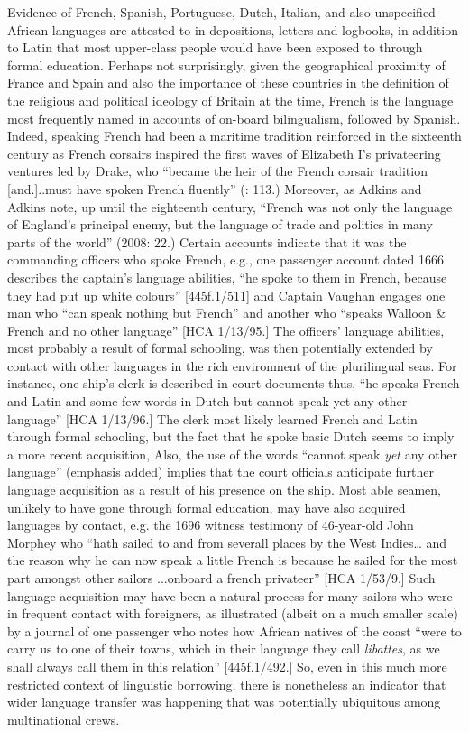 Evidence of French, Spanish, Portuguese, Dutch, Italian, and also unspecified African languages are attested to in depositions, letters and logbooks, in addition to Latin that most upper-class people would have been exposed to through formal education. Perhaps not surprisingly, given the geographical proximity of France and Spain and also the importance of these countries in the definition of the religious and political ideology of Britain at the time, French is the language most frequently named in accounts of on-board bilingualism, followed by Spanish. Indeed, speaking French had been a maritime tradition reinforced in the sixteenth century as French corsairs inspired the first waves of Elizabeth I’s privateering ventures led by Drake, who “became the heir of the French corsair tradition [and.]..must have spoken French fluently” (\citealt{Bicheno2012}: 113.) Moreover, as Adkins and Adkins note, up until the eighteenth century, “French was not only the language of England’s principal enemy, but the language of trade and politics in many parts of the world” (2008: 22.) Certain accounts indicate that it was the commanding officers who spoke French, e.g., one passenger account dated 1666 describes the captain’s language abilities, “he spoke to them in French, because they had put up white colours” [445f.1/511] and Captain Vaughan engages one man who “can speak nothing but French” and another who “speaks Walloon \& French and no other language” [HCA 1/13/95.] The officers’ language abilities, most probably a result of formal schooling, was then potentially extended by contact with other languages in the rich environment of the plurilingual seas. For instance, one ship’s clerk is described in court documents thus, “he speaks French and Latin and some few words in Dutch but cannot speak yet any other language” [HCA 1/13/96.] The clerk most likely learned French and Latin through formal schooling, but the fact that he spoke basic Dutch seems to imply a more recent acquisition, Also, the use of the words “cannot speak \textit{yet} any other language” (emphasis added) implies that the court officials anticipate further language acquisition as a result of his presence on the ship. Most able seamen, unlikely to have gone through formal education, may have also acquired languages by contact, e.g. the 1696 witness testimony of 46-year-old John Morphey who “hath sailed to and from severall places by the West Indies… and the reason why he can now speak a little French is because he sailed for the most part amongst other sailors ...onboard a french privateer” [HCA 1/53/9.] Such language acquisition may have been a natural process for many sailors who were in frequent contact with foreigners, as illustrated (albeit on a much smaller scale) by a journal of one passenger who notes how African natives of the coast “were to carry us to one of their towns, which in their language they call \textit{libattes}, as we shall always call them in this relation” [445f.1/492.]  So, even in this much more restricted context of linguistic borrowing, there is nonetheless an indicator that wider language transfer was happening that was potentially ubiquitous among multinational crews. 

